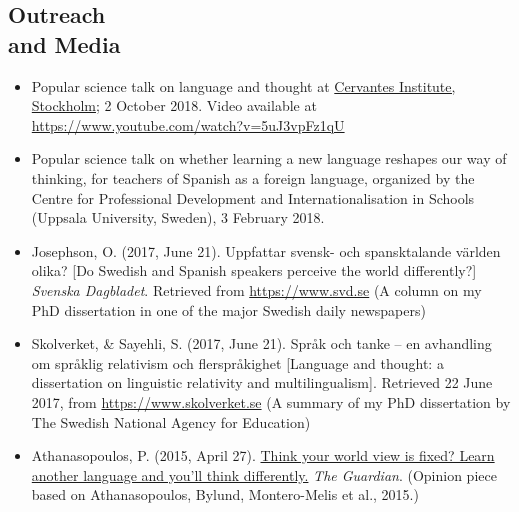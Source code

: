 \documentclass[margin, 11pt]{res} %
\begin{document}
\begin{resume}
\section{\sc Outreach \\and Media}

\begin{itemize}

\item Popular science talk on language and thought at \href{https://cultura.cervantes.es/estocolmo/es/-hablas-como-piensas--la-relacion-entre-el-lenguaje-y-el-pensamiento/122695}{Cervantes Institute, Stockholm}; 2 October 2018.
Video available at \url{https://www.youtube.com/watch?v=5uJ3vpFz1qU}

\item Popular science talk on whether learning a new language reshapes our way of thinking, for teachers of Spanish as a foreign language, organized by the Centre for Professional Development and Internationalisation in Schools (Uppsala University, Sweden), 3 February 2018.

\item Josephson, O. (2017, June 21). Uppfattar svensk- och spansktalande v{\"a}rlden olika? [Do Swedish and Spanish speakers perceive the world differently?] \emph{Svenska Dagbladet}. Retrieved from \url{https://www.svd.se} (A column on my PhD dissertation in one of the major Swedish daily newspapers)

\item Skolverket, \& Sayehli, S. (2017, June 21). Spr{\aa}k och tanke -- en avhandling om spr{\aa}klig relativism och flerspr{\aa}kighet [Language and thought: a dissertation on linguistic relativity and multilingualism]. Retrieved 22 June 2017, from \url{https://www.skolverket.se} (A summary of my PhD dissertation by The Swedish National Agency for Education)

\item Athanasopoulos, P. (2015, April 27). \href{https://www.theguardian.com/commentisfree/2015/apr/27/world-view-learn-another-language}{Think your world view is fixed? Learn another language and you'll think differently.} \emph{The Guardian}. (Opinion piece based on Athanasopoulos, Bylund, Montero-Melis et al., 2015.)

\end{itemize}


 

\end{resume}
\end{document}
